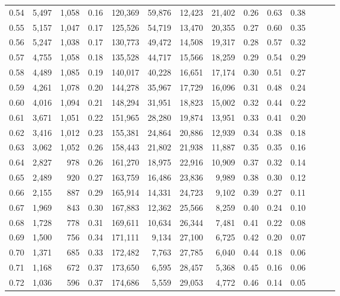 \begin{tabular}{rrrrrrrrrrrrrr}
0.54 &  5,497 &  1,058 &  0.16 &  120,369 &   59,876 &  12,423 &  21,402 &  0.26 &  0.63 &      0.38 \\
0.55 &  5,157 &  1,047 &  0.17 &  125,526 &   54,719 &  13,470 &  20,355 &  0.27 &  0.60 &      0.35 \\
0.56 &  5,247 &  1,038 &  0.17 &  130,773 &   49,472 &  14,508 &  19,317 &  0.28 &  0.57 &      0.32 \\
0.57 &  4,755 &  1,058 &  0.18 &  135,528 &   44,717 &  15,566 &  18,259 &  0.29 &  0.54 &      0.29 \\
0.58 &  4,489 &  1,085 &  0.19 &  140,017 &   40,228 &  16,651 &  17,174 &  0.30 &  0.51 &      0.27 \\
0.59 &  4,261 &  1,078 &  0.20 &  144,278 &   35,967 &  17,729 &  16,096 &  0.31 &  0.48 &      0.24 \\
0.60 &  4,016 &  1,094 &  0.21 &  148,294 &   31,951 &  18,823 &  15,002 &  0.32 &  0.44 &      0.22 \\
0.61 &  3,671 &  1,051 &  0.22 &  151,965 &   28,280 &  19,874 &  13,951 &  0.33 &  0.41 &      0.20 \\
0.62 &  3,416 &  1,012 &  0.23 &  155,381 &   24,864 &  20,886 &  12,939 &  0.34 &  0.38 &      0.18 \\
0.63 &  3,062 &  1,052 &  0.26 &  158,443 &   21,802 &  21,938 &  11,887 &  0.35 &  0.35 &      0.16 \\
0.64 &  2,827 &    978 &  0.26 &  161,270 &   18,975 &  22,916 &  10,909 &  0.37 &  0.32 &      0.14 \\
0.65 &  2,489 &    920 &  0.27 &  163,759 &   16,486 &  23,836 &   9,989 &  0.38 &  0.30 &      0.12 \\
0.66 &  2,155 &    887 &  0.29 &  165,914 &   14,331 &  24,723 &   9,102 &  0.39 &  0.27 &      0.11 \\
0.67 &  1,969 &    843 &  0.30 &  167,883 &   12,362 &  25,566 &   8,259 &  0.40 &  0.24 &      0.10 \\
0.68 &  1,728 &    778 &  0.31 &  169,611 &   10,634 &  26,344 &   7,481 &  0.41 &  0.22 &      0.08 \\
0.69 &  1,500 &    756 &  0.34 &  171,111 &    9,134 &  27,100 &   6,725 &  0.42 &  0.20 &      0.07 \\
0.70 &  1,371 &    685 &  0.33 &  172,482 &    7,763 &  27,785 &   6,040 &  0.44 &  0.18 &      0.06 \\
0.71 &  1,168 &    672 &  0.37 &  173,650 &    6,595 &  28,457 &   5,368 &  0.45 &  0.16 &      0.06 \\
0.72 &  1,036 &    596 &  0.37 &  174,686 &    5,559 &  29,053 &   4,772 &  0.46 &  0.14 &      0.05 \\

\end{tabular}
